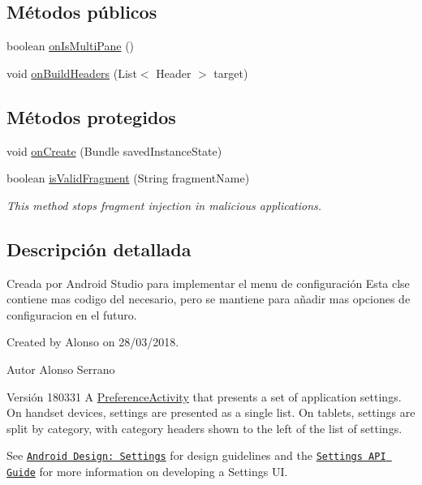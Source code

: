 \subsection*{Métodos públicos}
\begin{DoxyCompactItemize}
\item 
boolean \mbox{\hyperlink{classcom_1_1loalon_1_1pfg_1_1facepal_1_1_settings_activity_a995efc7713ab73f011b94ca414978e2b}{on\+Is\+Multi\+Pane}} ()
\item 
void \mbox{\hyperlink{classcom_1_1loalon_1_1pfg_1_1facepal_1_1_settings_activity_a417499e165b77d2364d710513d2387d2}{on\+Build\+Headers}} (List$<$ Header $>$ target)
\end{DoxyCompactItemize}
\subsection*{Métodos protegidos}
\begin{DoxyCompactItemize}
\item 
void \mbox{\hyperlink{classcom_1_1loalon_1_1pfg_1_1facepal_1_1_settings_activity_acbf6db83f2e35289e4eafe26afeba7c5}{on\+Create}} (Bundle saved\+Instance\+State)
\item 
boolean \mbox{\hyperlink{classcom_1_1loalon_1_1pfg_1_1facepal_1_1_settings_activity_a98d18558ba2f0fd351970dbda2de05e8}{is\+Valid\+Fragment}} (String fragment\+Name)
\begin{DoxyCompactList}\small\item\em This method stops fragment injection in malicious applications. \end{DoxyCompactList}\end{DoxyCompactItemize}


\subsection{Descripción detallada}
Creada por Android Studio para implementar el menu de configuración Esta clse contiene mas codigo del necesario, pero se mantiene para añadir mas opciones de configuracion en el futuro. 

Created by Alonso on 28/03/2018. \begin{DoxyAuthor}{Autor}
Alonso Serrano 
\end{DoxyAuthor}
\begin{DoxyVersion}{Versión}
180331 A \mbox{\hyperlink{}{Preference\+Activity}} that presents a set of application settings. On handset devices, settings are presented as a single list. On tablets, settings are split by category, with category headers shown to the left of the list of settings. 
\end{DoxyVersion}
See \href{http://developer.android.com/design/patterns/settings.html}{\tt Android Design\+: Settings} for design guidelines and the \href{http://developer.android.com/guide/topics/ui/settings.html}{\tt Settings A\+PI Guide} for more information on developing a Settings UI. 

